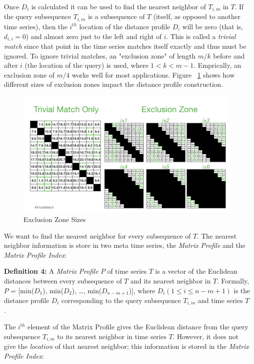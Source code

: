 \documentclass[conference]{IEEEtran}
\begin{document}
Once $D_i$ is calculated it can be used to find the nearest neighbor of $T_{i,m}$ in $T$.  If the query subsequence $T_{i,m}$ is a subsequence of $T$ (itself, as opposed to another time series), then the $i^{th}$ location of the distance profile $D_i$ will be zero (that is, $d_{i,i} = 0$) and almost zero just to the left and right of $i$.  This is called a \emph{trivial match} since that point in the time series matches itself exactly and thus must be ignored.  To ignore trivial matches, an "exclusion zone" of length $m/k$ before and after $i$ (the location of the query) is used, where $1 < k < m-1$.  Emprically, an exclusion zone of $m/4$ works well for most applications.  Figure ~\ref{fig:ExclusionZone} shows how different sizes of exclusion zones impact the distance profile construction\cite{Stumpy}.

\begin{figure}
\begin{center}
\includegraphics[scale=0.25]{exclusion_zone.jpg}
\caption{Exclusion Zone Sizes}
\label{fig:ExclusionZone}
\end{center}
\end{figure}

We want to find the nearest neighbor for every subsequence of $T$.  The nearest neighbor information is store in two meta time series, the \emph{Matrix Profile} and the \emph{Matrix Profile Index}:

\textbf{Definition 4:} A \emph{Matrix Profile} $P$ of time series $T$ is a vector of the Euclidean distances between every subsequence of $T$ and its nearest neighbor in $T$.  Formally, $P$ = [min($D_1$), min($D_2$), \ldots{}, min($D_{n-m+1}$)], where $D_i(1 \leq i \leq n-m+1)$ is the distance profile $D_i$ corresponding to the query subsequence $T_{i,m}$ and time series $T$.

The $i^{th}$ element of the Matrix Profile gives the Euclidean distance from the query subsequence $T_{i,m}$ to its nearest neighbor in time series $T$.  However, it does not give the \emph{location} of that nearest neighbor; this information is stored in the \emph{Matrix Profile Index}:
\end{document}
